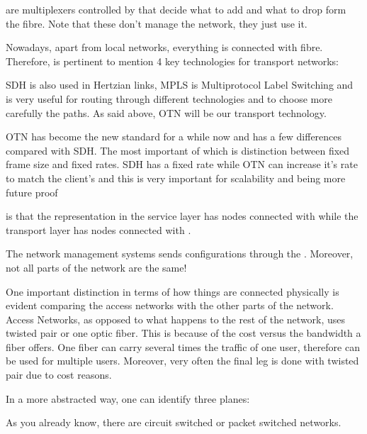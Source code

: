 

 are multiplexers controlled by  that decide what to add and what to drop form the fibre. Note that these don't manage the network, they just use it.

Nowadays, apart from local networks, everything is connected with fibre. Therefore, is pertinent to mention 4 key technologies for transport networks:


SDH is also used in Hertzian links, MPLS is Multiprotocol Label Switching and is very useful for routing through different technologies and to choose more carefully the paths. As said above, OTN will be our transport technology.

OTN has become the new standard for a while now and has a few differences compared with SDH. The most important of which is distinction between fixed frame size and fixed rates. SDH has a fixed rate while OTN can increase it's rate to match the client's and this is very important for scalability and being more future proof

 is that the representation in the service layer has nodes connected with  while the transport layer has nodes connected with .



The network management systems sends configurations through the . Moreover, not all parts of the network are the same!



One important distinction in terms of how things are connected physically is evident comparing the access networks with the other parts of the network. Access Networks, as opposed to what happens to the rest of the network, uses twisted pair or one optic fiber. This is because of the cost versus the bandwidth a fiber offers. One fiber can carry several times the traffic of one user, therefore can be used for multiple users. Moreover, very often the final leg is done with twisted pair due to cost reasons.

In a more abstracted way, one can identify three planes:


As you already know, there are circuit switched or packet switched networks.

